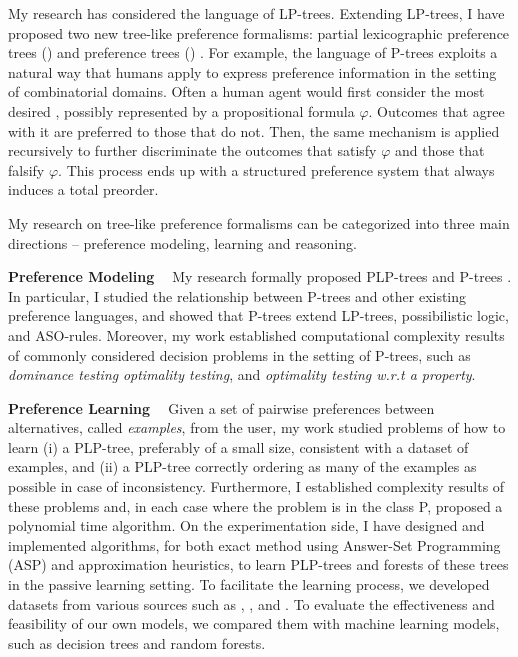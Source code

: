 My research has considered the language of LP-trees.
Extending LP-trees, I have proposed two new tree-like preference formalisms:
partial lexicographic preference trees () \cite{conf/aaai15/LiuT}
and preference trees () \cite{fraser1994,liu2014preference,conf/adt15/liuT}.
For example, the language of P-trees exploits a natural way that humans apply to
express preference information in the setting of combinatorial domains.
Often a human agent would first consider the most desired ,
possibly represented by a propositional formula $\varphi$.
Outcomes that agree with it are preferred to those that do not.  
Then, the same mechanism is applied recursively to further discriminate the 
outcomes that satisfy $\varphi$ and those that falsify $\varphi$.
This process ends up with a structured preference system that always
induces a total preorder.

My research on tree-like preference formalisms can be categorized into
three main directions -- preference modeling, learning and reasoning.

\smallskip \noindent \textbf{Preference Modeling \ }
\noindent My research formally proposed 
PLP-trees \cite{conf/aaai15/LiuT} and P-trees \cite{liu2014preference,conf/adt15/liuT}.
In particular, I studied
the relationship between P-trees and other existing preference languages, and
showed that P-trees extend
LP-trees, possibilistic logic, and ASO-rules.
Moreover, my work established computational complexity results of commonly considered decision
problems in the setting of P-trees, such as \textit{dominance testing} 
\textit{optimality testing}, and
\textit{optimality testing w.r.t a property}.

\smallskip \noindent \textbf{Preference Learning \ }
Given a set of pairwise preferences between alternatives, called \textit{examples}, from the user,
my work \cite{conf/aaai15/LiuT} studied problems of how to learn (i) a PLP-tree, 
preferably of a small size, 
consistent with a dataset of examples, and (ii) a PLP-tree correctly
ordering as many of the examples as possible in case
of inconsistency. Furthermore, I established complexity results
of these problems and, in each case where the problem
is in the class P, proposed a polynomial time algorithm.
On the experimentation side,
I have designed and implemented algorithms, for both exact method using
Answer-Set Programming (ASP) and approximation heuristics, to learn PLP-trees 
and forests of these trees in the passive learning setting.
To facilitate the learning process, we developed datasets
from various sources such as ,
, and .
To evaluate the effectiveness and feasibility of our own models, we 
compared them with machine learning models, such as 
decision trees and random forests.

